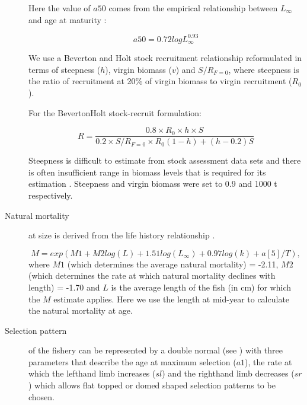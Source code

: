\documentclass[10pt]{article}
\begin{document}
\begin{description}
Here the value of $a50$ comes from the empirical relationship between $L_{\infty}$ and age at maturity \cite{gislason2008coexistence}:

\begin{equation}
  a50=0.72 logL_{\infty}^{0.93}
\end{equation}

We use a Beverton and Holt stock recruitment relationship reformulated in terms of steepness ($h$), virgin biomass ($v$) and $S/R_{F=0}$, 
where steepness is the ratio of recruitment at 20\% of virgin biomass to virgin recruitment ($R_0$). 

For the BevertonHolt stock-recruit formulation:

\begin{equation}
R=\frac{0.8 \times R_0 \times h \times S}{0.2 \times S/R_{F=0} \times R_0(1-h)+(h-0.2)S}
\end{equation} 

Steepness is difficult to estimate from stock assessment data sets and there is often insufficient range in biomass levels that is required for its estimation \cite{ISSF2011steep}.
Steepness and virgin biomass were set to 0.9 and 1000 t respectively.

\item[Natural mortality]
at size is derived from the life history relationship \cite{gislason2010does}.
               
\begin{equation}
            M = exp(M1 + M2 log(L) + 1.51log(L_{\infty}) + 0.97log(k) + a[5]/T),
\end{equation} 
where $M1$ (which determines the average natural mortality) = -2.11, $M2$ (which determines the rate at which natural mortality declines with length) = -1.70 and $L$ is 
the average length of the fish (in cm) for which the $M$ estimate applies. Here we use the length at mid-year to calculate the natural mortality at age.


\item[Selection pattern] 
of the fishery can be represented by a double normal 
(see \cite{Hilbornetal2000}) with three parameters that describe the age at maximum selection ($a1$), the rate at which the lefthand 
limb increases ($sl$) and the righthand limb decreases ($sr$) which allows flat topped or domed shaped selection patterns to be chosen.


\end{description}
\end{document}
